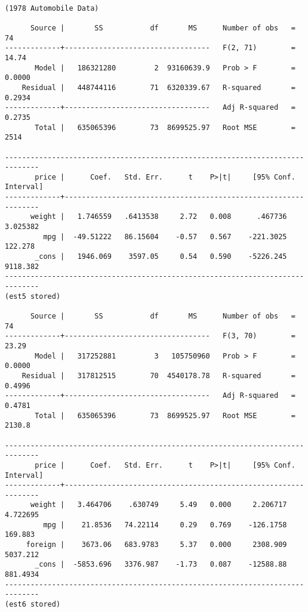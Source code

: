 \documentclass[10pt,parskip=half,
	toc=sectionentrywithdots,
	bibliography=totocnumbered,
	captions=tableheading,numbers=noendperiod]{scrartcl}
\begin{document}
\begin{lstlisting}[language={},postbreak={},numbers=none,xrightmargin=7pt,belowskip=5pt,aboveskip=5pt,breakindent=0pt]

(1978 Automobile Data)

      Source |       SS           df       MS      Number of obs   =        74
-------------+----------------------------------   F(2, 71)        =     14.74
       Model |   186321280         2  93160639.9   Prob > F        =    0.0000
    Residual |   448744116        71  6320339.67   R-squared       =    0.2934
-------------+----------------------------------   Adj R-squared   =    0.2735
       Total |   635065396        73  8699525.97   Root MSE        =      2514

------------------------------------------------------------------------------
       price |      Coef.   Std. Err.      t    P>|t|     [95% Conf. Interval]
-------------+----------------------------------------------------------------
      weight |   1.746559   .6413538     2.72   0.008      .467736    3.025382
         mpg |  -49.51222   86.15604    -0.57   0.567    -221.3025     122.278
       _cons |   1946.069    3597.05     0.54   0.590    -5226.245    9118.382
------------------------------------------------------------------------------
(est5 stored)

      Source |       SS           df       MS      Number of obs   =        74
-------------+----------------------------------   F(3, 70)        =     23.29
       Model |   317252881         3   105750960   Prob > F        =    0.0000
    Residual |   317812515        70  4540178.78   R-squared       =    0.4996
-------------+----------------------------------   Adj R-squared   =    0.4781
       Total |   635065396        73  8699525.97   Root MSE        =    2130.8

------------------------------------------------------------------------------
       price |      Coef.   Std. Err.      t    P>|t|     [95% Conf. Interval]
-------------+----------------------------------------------------------------
      weight |   3.464706    .630749     5.49   0.000     2.206717    4.722695
         mpg |    21.8536   74.22114     0.29   0.769    -126.1758     169.883
     foreign |    3673.06   683.9783     5.37   0.000     2308.909    5037.212
       _cons |  -5853.696   3376.987    -1.73   0.087    -12588.88    881.4934
------------------------------------------------------------------------------
(est6 stored)

\end{lstlisting}
\end{document}
